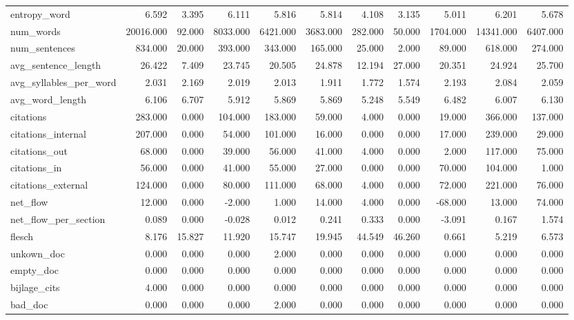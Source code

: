 \begin{tabular}{lrrrrrrrrrr}
\cline{1-11}
entropy\_word & 6.592 & 3.395 & 6.111 & 5.816 & 5.814 & 4.108 & 3.135 & 5.011 & 6.201 & 5.678 \\
\cline{1-11}
num\_words & 20016.000 & 92.000 & 8033.000 & 6421.000 & 3683.000 & 282.000 & 50.000 & 1704.000 & 14341.000 & 6407.000 \\
\cline{1-11}
num\_sentences & 834.000 & 20.000 & 393.000 & 343.000 & 165.000 & 25.000 & 2.000 & 89.000 & 618.000 & 274.000 \\
\cline{1-11}
avg\_sentence\_length & 26.422 & 7.409 & 23.745 & 20.505 & 24.878 & 12.194 & 27.000 & 20.351 & 24.924 & 25.700 \\
\cline{1-11}
avg\_syllables\_per\_word & 2.031 & 2.169 & 2.019 & 2.013 & 1.911 & 1.772 & 1.574 & 2.193 & 2.084 & 2.059 \\
\cline{1-11}
avg\_word\_length & 6.106 & 6.707 & 5.912 & 5.869 & 5.869 & 5.248 & 5.549 & 6.482 & 6.007 & 6.130 \\
\cline{1-11}
citations & 283.000 & 0.000 & 104.000 & 183.000 & 59.000 & 4.000 & 0.000 & 19.000 & 366.000 & 137.000 \\
\cline{1-11}
citations\_internal & 207.000 & 0.000 & 54.000 & 101.000 & 16.000 & 0.000 & 0.000 & 17.000 & 239.000 & 29.000 \\
\cline{1-11}
citations\_out & 68.000 & 0.000 & 39.000 & 56.000 & 41.000 & 4.000 & 0.000 & 2.000 & 117.000 & 75.000 \\
\cline{1-11}
citations\_in & 56.000 & 0.000 & 41.000 & 55.000 & 27.000 & 0.000 & 0.000 & 70.000 & 104.000 & 1.000 \\
\cline{1-11}
citations\_external & 124.000 & 0.000 & 80.000 & 111.000 & 68.000 & 4.000 & 0.000 & 72.000 & 221.000 & 76.000 \\
\cline{1-11}
net\_flow & 12.000 & 0.000 & -2.000 & 1.000 & 14.000 & 4.000 & 0.000 & -68.000 & 13.000 & 74.000 \\
\cline{1-11}
net\_flow\_per\_section & 0.089 & 0.000 & -0.028 & 0.012 & 0.241 & 0.333 & 0.000 & -3.091 & 0.167 & 1.574 \\
\cline{1-11}
flesch & 8.176 & 15.827 & 11.920 & 15.747 & 19.945 & 44.549 & 46.260 & 0.661 & 5.219 & 6.573 \\
\cline{1-11}
unkown\_doc & 0.000 & 0.000 & 0.000 & 2.000 & 0.000 & 0.000 & 0.000 & 0.000 & 0.000 & 0.000 \\
\cline{1-11}
empty\_doc & 0.000 & 0.000 & 0.000 & 0.000 & 0.000 & 0.000 & 0.000 & 0.000 & 0.000 & 0.000 \\
\cline{1-11}
bijlage\_cits & 4.000 & 0.000 & 0.000 & 0.000 & 0.000 & 0.000 & 0.000 & 0.000 & 0.000 & 0.000 \\
\cline{1-11}
bad\_doc & 0.000 & 0.000 & 0.000 & 2.000 & 0.000 & 0.000 & 0.000 & 0.000 & 0.000 & 0.000 \\
\cline{1-11}
\bottomrule
\end{tabular}
